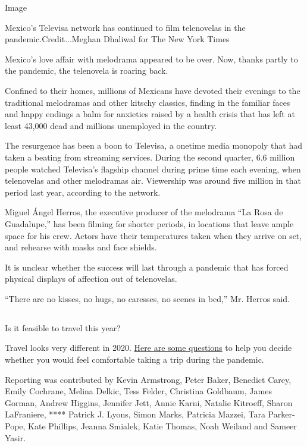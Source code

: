 Image

Mexico's Televisa network has continued to film telenovelas in the
pandemic.Credit...Meghan Dhaliwal for The New York Times

Mexico's love affair with melodrama appeared to be over. Now, thanks
partly to the pandemic, the telenovela is roaring back.

Confined to their homes, millions of Mexicans have devoted their
evenings to the traditional melodramas and other kitschy classics,
finding in the familiar faces and happy endings a balm for anxieties
raised by a health crisis that has left at least 43,000 dead and
millions unemployed in the country.

The resurgence has been a boon to Televisa, a onetime media monopoly
that had taken a beating from streaming services. During the second
quarter, 6.6 million people watched Televisa's flagship channel during
prime time each evening, when telenovelas and other melodramas air.
Viewership was around five million in that period last year, according
to the network.

Miguel Ángel Herros, the executive producer of the melodrama ``La Rosa
de Guadalupe,'' has been filming for shorter periods, in locations that
leave ample space for his crew. Actors have their temperatures taken
when they arrive on set, and rehearse with masks and face shields.

It is unclear whether the success will last through a pandemic that has
forced physical displays of affection out of telenovelas.

``There are no kisses, no hugs, no caresses, no scenes in bed,'' Mr.
Herros said.

\hypertarget{-12}{%
\subsection{}\label{-12}}

Is it feasible to travel this year?

Travel looks very different in 2020.
\href{https://www.nytimes3xbfgragh.onion/interactive/2020/07/31/travel/coronavirus-travel-risk.html}{Here
are some questions} to help you decide whether you would feel
comfortable taking a trip during the pandemic.

Reporting was contributed by Kevin Armstrong, Peter Baker, Benedict
Carey, Emily Cochrane, Melina Delkic, Tess Felder, Christina Goldbaum,
James Gorman, Andrew Higgins, Jennifer Jett, Annie Karni, Natalie
Kitroeff, Sharon LaFraniere, **** Patrick J. Lyons, Simon Marks,
Patricia Mazzei, Tara Parker-Pope, Kate Phillips, Jeanna Smialek, Katie
Thomas, Noah Weiland and Sameer Yasir.


